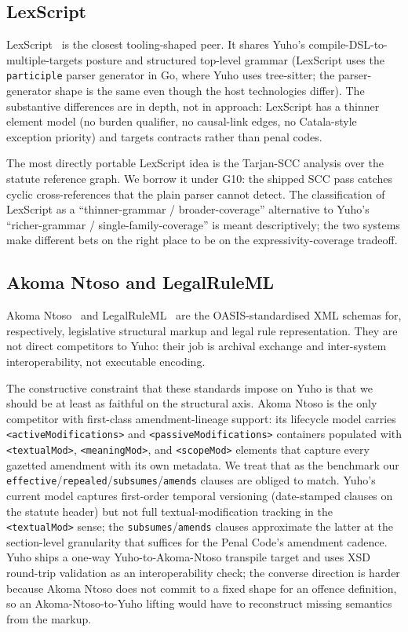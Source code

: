 \subsection{LexScript}
\label{subsec:rel_lexscript}

LexScript~\cite{lexscript} is the closest tooling-shaped peer. It
shares Yuho's compile-DSL-to-multiple-targets posture and structured
top-level grammar (LexScript uses the \texttt{participle} parser
generator in Go, where Yuho uses tree-sitter; the parser-generator
shape is the same even though the host technologies differ). The
substantive differences are in depth, not in approach: LexScript
has a thinner element model (no burden qualifier, no causal-link
edges, no Catala-style exception priority) and targets contracts
rather than penal codes.

The most directly portable LexScript idea is the Tarjan-SCC analysis
over the statute reference graph. We borrow it under \textsf{G10}:
the shipped SCC pass catches cyclic cross-references that the
plain parser cannot detect. The classification of LexScript as a
``thinner-grammar / broader-coverage'' alternative to Yuho's
``richer-grammar / single-family-coverage'' is meant descriptively;
the two systems make different bets on the right place to be on the
expressivity-coverage tradeoff.

\subsection{Akoma Ntoso and LegalRuleML}
\label{subsec:rel_akn}

Akoma Ntoso~\cite{akomantoso} and LegalRuleML~\cite{legalruleml}
are the OASIS-standardised XML schemas for, respectively, legislative
structural markup and legal rule representation. They are not direct
competitors to Yuho: their job is archival exchange and inter-system
interoperability, not executable encoding.

The constructive constraint that these standards impose on Yuho is
that we should be at least as faithful on the structural axis. Akoma
Ntoso is the only competitor with first-class amendment-lineage
support: its lifecycle model carries \texttt{<activeModifications>}
and \texttt{<passiveModifications>} containers populated with
\texttt{<textualMod>}, \texttt{<meaningMod>}, and \texttt{<scopeMod>}
elements that capture every gazetted amendment with its own metadata.
We treat that as the benchmark our
\texttt{effective}/\texttt{repealed}/\texttt{subsumes}/\texttt{amends}
clauses are obliged to match. Yuho's current model captures
first-order temporal versioning (date-stamped clauses on the statute
header) but not full textual-modification tracking in the
\texttt{<textualMod>} sense; the \texttt{subsumes}/\texttt{amends}
clauses approximate the latter at the section-level granularity that
suffices for the Penal Code's amendment cadence. Yuho ships a one-way
Yuho-to-Akoma-Ntoso transpile target and uses XSD round-trip validation
as an interoperability check; the converse direction is harder because
Akoma Ntoso does not commit to a fixed
shape for an offence definition, so an Akoma-Ntoso-to-Yuho lifting
would have to reconstruct missing semantics from the markup.

